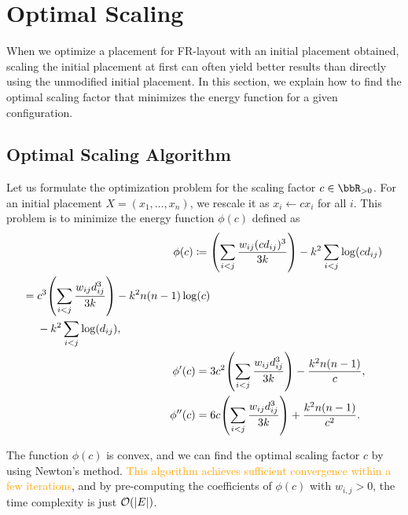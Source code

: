 \documentclass[dvipdfmx,journal]{IEEEtran}
\newcommand{\orange}[1]{\textcolor{orange}{#1}}
\newcommand{\defeq}{\coloneqq}
\begin{document}

\appendices

\section{Optimal Scaling}\label{sec:scaling}

When we optimize a placement for FR-layout with an initial placement obtained, scaling the initial placement at first can often yield better results than directly using the unmodified initial placement.
In this section, we explain how to find the optimal scaling factor that minimizes the energy function for a given configuration.

\subsection{Optimal Scaling Algorithm}\label{ssec:scalingAlgorithm}

Let us formulate the optimization problem for the scaling factor $c \in \bbR_{> 0}$. For an initial placement $X = (x_1, \dots, x_n)$, we rescale it as $x_i \gets c x_i$ for all $i$.
This problem is to minimize the energy function $\phi(c)$ defined as
\begin{align*}
  \phi(c) \defeq {} & \qty(\sum_{i < j} \frac{w_{ij} (cd_{ij})^3}{3k}) - k^2 \sum_{i < j} \log(c d_{ij}) \\
  \begin{split}
    = {} & c^3 \qty(\sum_{i < j} \frac{w_{ij} d_{ij}^3}{3k}) - k^2 n(n-1)\log(c) \\
    & - k^2 \sum_{i < j} \log(d_{ij}),
  \end{split}                                                                             \\
  \phi'(c) = {}     & 3c^2 \qty(\sum_{i < j} \frac{w_{ij} d_{ij}^3}{3k}) - \frac{k^2 n(n-1)}{c},         \\
  \phi''(c) = {}    & 6c \qty(\sum_{i < j} \frac{w_{ij} d_{ij}^3}{3k}) + \frac{k^2 n(n-1)}{c^2}.
\end{align*}

The function $\phi(c)$ is convex, and we can find the optimal scaling factor $c$ by using Newton's method.
\orange{This algorithm achieves sufficient convergence within a few iterations}, and by pre-computing the coefficients of $\phi(c)$ with $w_{i,j} > 0$, the time complexity is just $\order{\abs{E}}$.
\end{document}
